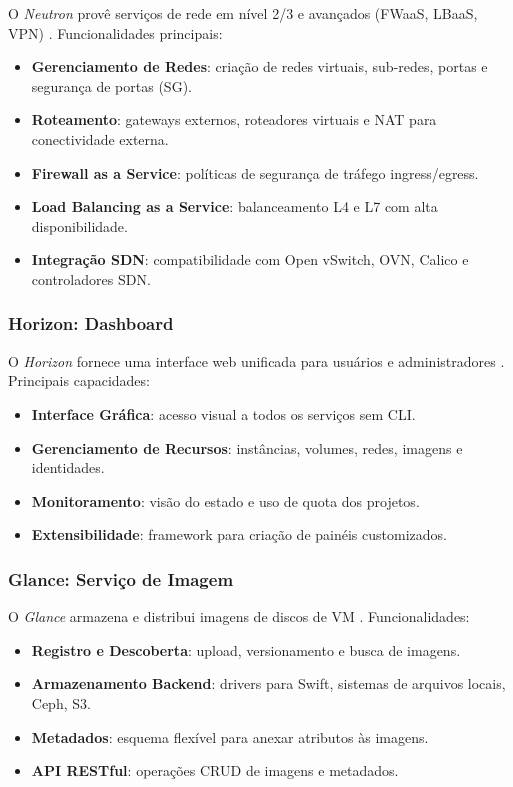 O \textit{Neutron} provê serviços de rede em nível 2/3 e avançados (FWaaS, LBaaS, VPN) \cite{openstack_neutron}. Funcionalidades principais:
\begin{itemize}
    \item \textbf{Gerenciamento de Redes}: criação de redes virtuais, sub-redes, portas e segurança de portas (SG).
    \item \textbf{Roteamento}: gateways externos, roteadores virtuais e NAT para conectividade externa.
    \item \textbf{Firewall as a Service}: políticas de segurança de tráfego ingress/egress.
    \item \textbf{Load Balancing as a Service}: balanceamento L4 e L7 com alta disponibilidade.
    \item \textbf{Integração SDN}: compatibilidade com Open vSwitch, OVN, Calico e controladores SDN.
\end{itemize}

\subsubsection{Horizon: Dashboard}

O \textit{Horizon} fornece uma interface web unificada para usuários e administradores \cite{openstack_horizon}. Principais capacidades:
\begin{itemize}
    \item \textbf{Interface Gráfica}: acesso visual a todos os serviços sem CLI.
    \item \textbf{Gerenciamento de Recursos}: instâncias, volumes, redes, imagens e identidades.
    \item \textbf{Monitoramento}: visão do estado e uso de quota dos projetos.
    \item \textbf{Extensibilidade}: framework para criação de painéis customizados.
\end{itemize}

\subsubsection{Glance: Serviço de Imagem}

O \textit{Glance} armazena e distribui imagens de discos de VM \cite{openstack_glance}. Funcionalidades:
\begin{itemize}
    \item \textbf{Registro e Descoberta}: upload, versionamento e busca de imagens.
    \item \textbf{Armazenamento Backend}: drivers para Swift, sistemas de arquivos locais, Ceph, S3.
    \item \textbf{Metadados}: esquema flexível para anexar atributos às imagens.
    \item \textbf{API RESTful}: operações CRUD de imagens e metadados.
\end{itemize}


